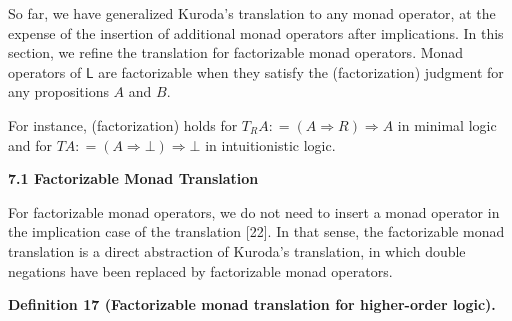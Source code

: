  
So far, we have generalized Kuroda’s translation to any monad operator, at the expense of the insertion of additional monad operators after implications. In this section, we refine the translation for factorizable monad operators. Monad operators of $\mathsf{L}$ are factorizable when they satisfy the (factorization) judgment for any propositions $A$ and $B$.\par
 
\begin{center}\end{center}
 
For instance, (factorization) holds for $T_{R}A\mathrel{\mathop{:}}=(A\mathbin{\Rightarrow}R)\mathbin{\Rightarrow}A$ in minimal logic and for $TA\mathrel{\mathop{:}}=(A\mathbin{\Rightarrow}\bot)\mathbin{\Rightarrow}\bot$ in intuitionistic logic.\par
 
 
 
\par\medskip\noindent\textbf{7.1 Factorizable Monad Translation}\par
 
 
For factorizable monad operators, we do not need to insert a monad operator in the implication case of the translation [22]. In that sense, the factorizable monad translation is a direct abstraction of Kuroda’s translation, in which double negations have been replaced by factorizable monad operators.\par
 
 
 
\par\medskip\noindent\textbf{Definition 17 (Factorizable monad translation for higher-order logic).}\par
 
 
